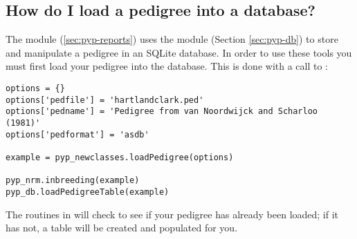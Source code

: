 \subsection{How do I load a pedigree into a database?}
\label{sec:howto-load-pedigree-db}
The  module (\ref{sec:pyp-reports}) uses the  module (Section \ref{sec:pyp-db})
to store and manipulate a pedigree in an SQLite database.  In order to use these tools you must first load your pedigree into
the database.  This is done with a call to :
\begin{verbatim}
options = {}
options['pedfile'] = 'hartlandclark.ped'
options['pedname'] = 'Pedigree from van Noordwijck and Scharloo (1981)'
options['pedformat'] = 'asdb'

example = pyp_newclasses.loadPedigree(options)

pyp_nrm.inbreeding(example)
pyp_db.loadPedigreeTable(example)
\end{verbatim}
The routines in  will check to see if your pedigree has already been loaded; if it
has not, a table will be created and populated for you.
